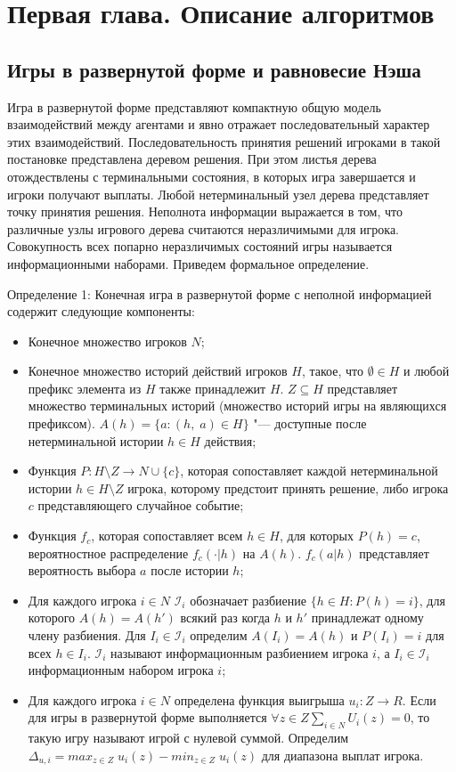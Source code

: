 \chapter{Первая глава. Описание алгоритмов}
\label{cha:ch_1}
\section{Игры в развернутой форме и равновесие Нэша}
\par
Игра в развернутой форме представляют компактную общую модель взаимодействий между агентами и явно отражает последовательный характер этих взаимодействий. Последовательность принятия решений игроками в такой постановке представлена деревом решения. При этом листья дерева отождествлены с терминальными состояния, в которых игра завершается и игроки получают выплаты. Любой нетерминальный узел дерева представляет точку принятия решения. Неполнота информации выражается в том, что различные узлы игрового дерева считаются неразличимыми для игрока. Совокупность всех попарно неразличимых состояний игры называется информационными наборами. Приведем формальное определение.
\par
Определение 1: Конечная игра в развернутой форме с неполной информацией содержит следующие компоненты:
\begin{itemize}
	\item Конечное множество игроков $N$;
	\item Конечное множество историй действий игроков $H$, такое, что $\emptyset \in H$ и любой префикс элемента из $H$ также принадлежит $H$. $Z \subseteq H$ представляет множество терминальных историй (множество историй игры на являющихся префиксом). $A(h)=\{a \colon (h,\;a)\in H \}$ "--- доступные после нетерминальной истории $h\in H$ действия;
	\item Функция $P\colon H\setminus Z \to N \cup \{c\}$, которая сопоставляет каждой нетерминальной истории $h\in H\setminus Z$ игрока, которому предстоит принять решение, либо игрока $c$ представляющего случайное событие;
	\item Функция $f_c$, которая сопоставляет всем $h \in H$, для которых $P(h)=c$, вероятностное распределение $f_c(\cdot |h)$ на $A(h)$. $f_c(a|h)$ представляет вероятность выбора $a$ после истории $h$;
	\item Для каждого игрока $i \in N$ $\mathcal{I}_i $ обозначает разбиение $ \{h \in H \colon P(h) = i\}$, для которого $A(h)=A(h')$ всякий раз когда $h$ и $h'$ принадлежат одному члену разбиения. Для $I_i \in \mathcal{I}_i$ определим $A(I_i)=A(h)$ и $P(I_i)=i$ для всех $h \in I_i$. $\mathcal{I}_i$ называют информационным разбиением игрока $i$, а $I_i \in \mathcal{I}_i$ информационным набором игрока $i$;
	\item Для каждого игрока $i \in N$ определена функция выигрыша $u_i \colon Z \to R$. Если для игры в развернутой форме выполняется $\forall z \in Z \sum_{i \in N}U_i(z) = 0 $, то такую игру называют игрой с нулевой суммой. Определим $\Delta_{u,i} = max_{z\in Z}\;u_i(z) - min_{z\in Z}\;u_i(z)$ для диапазона выплат игрока. 
\end{itemize}
